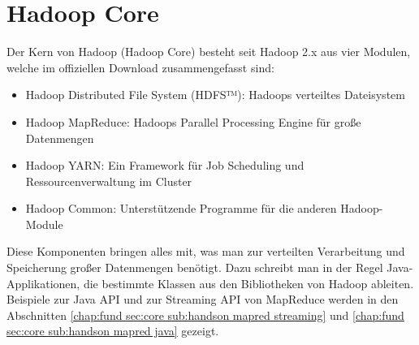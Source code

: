 \chapter{Hadoop Core}
Der Kern von Hadoop (Hadoop Core) besteht seit Hadoop 2.x aus vier Modulen, welche im offiziellen Download zusammengefasst sind\cite{noauthor_apache_nodate}:
\begin{itemize}
    \item Hadoop Distributed File System (HDFS™): Hadoops verteiltes Dateisystem
    \item Hadoop MapReduce: Hadoops Parallel Processing Engine für große Datenmengen
    \item Hadoop YARN: Ein Framework für Job Scheduling und Ressourcenverwaltung im Cluster
    \item Hadoop Common: Unterstützende Programme für die anderen Hadoop-Module
\end{itemize}
Diese Komponenten bringen alles mit, was man zur verteilten Verarbeitung und Speicherung großer Datenmengen benötigt. Dazu schreibt man in der Regel Java-Applikationen, die bestimmte Klassen aus den Bibliotheken von Hadoop ableiten. Beispiele zur Java API und zur Streaming API von MapReduce werden in den Abschnitten \ref{chap:fund sec:core sub:handson mapred streaming} und \ref{chap:fund sec:core sub:handson mapred java} gezeigt. 

